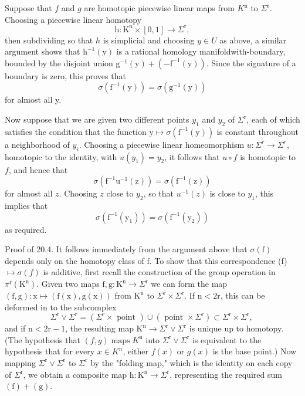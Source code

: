 \documentclass[10pt]{article}
\begin{document}
Suppose that $f$ and $g$ are homotopic piecewise linear maps from $K^{\mathrm{n}}$ to $\Sigma^{\mathrm{r}}$. Choosing a piecewise linear homotopy
$$
\mathrm{h}: \mathrm{K}^{\mathrm{n}} \times[0,1] \rightarrow \Sigma^{\mathrm{r}},
$$
then subdividing so that $h$ is simplicial and choosing $y \in U$ as above, a similar argument shows that $\mathrm{h}^{-1}(\mathrm{y})$ is a rational homology manifoldwith-boundary, bounded by the disjoint union $\mathrm{g}^{-1}(\mathrm{y})+\left(-\mathrm{f}^{-1}(\mathrm{y})\right)$. Since the signature of a boundary is zero, this proves that
$$
\sigma\left(\mathrm{f}^{-1}(\mathrm{y})\right)=\sigma\left(\mathrm{g}^{-1}(\mathrm{y})\right)
$$
for almost all y.

Now suppose that we are given two different points $y_{1}$ and $y_{2}$ of $\Sigma^{\mathrm{r}}$, each of which satisfies the condition that the function $\mathrm{y} \mapsto \sigma\left(\mathrm{f}^{-1}(\mathrm{y})\right)$ is constant throughout a neighborhood of $y_{i}$. Choosing a piecewise linear homeomorphism $u: \Sigma^{r} \rightarrow \Sigma^{r}$, homotopic to the identity, with $u\left(y_{1}\right)=y_{2}$, it follows that $u \circ f$ is homotopic to $f$, and hence that
$$
\sigma\left(\mathrm{f}^{-1} \mathrm{u}^{-1}(\mathrm{z})\right)=\sigma\left(\mathrm{f}^{-1}(\mathrm{z})\right)
$$
for almost all $z$. Choosing $z$ close to $y_{2}$, so that $u^{-1}(z)$ is close to $y_{1}$, this implies that
$$
\sigma\left(\mathrm{f}^{-1}\left(\mathrm{y}_{1}\right)\right)=\sigma\left(\mathrm{f}^{-1}\left(\mathrm{y}_{2}\right)\right)
$$
as required.

Proof of 20.4. It follows immediately from the argument above that $\sigma(\mathrm{f})$ depends only on the homotopy class of $\mathrm{f}$. To show that this correspondence (f) $\mapsto \sigma(f)$ is additive, first recall the construction of the group operation in $\pi^{\mathrm{r}}\left(\mathrm{K}^{\mathrm{n}}\right)$. Given two maps $\mathrm{f}, \mathrm{g}: \mathrm{K}^{\mathrm{n}} \rightarrow \Sigma^{\mathrm{r}}$ we can form the map $(\mathrm{f}, \mathrm{g}): \mathrm{x} \mapsto(\mathrm{f}(\mathrm{x}), \mathrm{g}(\mathrm{x}))$ from $\mathrm{K}^{\mathrm{n}}$ to $\Sigma^{\mathrm{r}} \times \Sigma^{\mathrm{r}}$. If $\mathrm{n}<2 \mathrm{r}$, this can be deformed in to the subcomplex
$$
\Sigma^{\mathrm{r}} \vee \Sigma^{\mathrm{r}}=\left(\Sigma^{\mathrm{r}} \times \text { point }\right) \cup\left(\text { point } \times \Sigma^{\mathrm{r}}\right) \subset \Sigma^{\mathrm{r}} \times \Sigma^{\mathrm{r}} \text {, }
$$
and if $\mathrm{n}<2 \mathrm{r}-1$, the resulting map $\mathrm{K}^{\mathrm{n}} \rightarrow \Sigma^{\mathrm{r}} \vee \Sigma^{\mathrm{r}}$ is unique up to homotopy. (The hypothesis that $(f, g) \operatorname{maps} K^{\mathrm{n}}$ into $\Sigma^{\mathrm{r}} \vee \Sigma^{\mathrm{r}}$ is equivalent to the hypothesis that for every $x \in K^{n}$, either $f(x)$ or $g(x)$ is the base point.) Now mapping $\Sigma^{\mathrm{r}} \vee \Sigma^{\mathrm{r}}$ to $\Sigma^{\mathrm{r}}$ by the "folding map," which is the identity on each copy of $\Sigma^{\mathrm{r}}$, we obtain a composite map $\mathrm{h}: \mathrm{K}^{\mathrm{n}} \rightarrow \Sigma^{\mathrm{r}}$, representing the required sum $(\mathrm{f})+(\mathrm{g})$.
\end{document}
